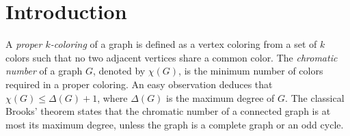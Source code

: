 \documentclass[11pt, a4paper]{article}
\theoremstyle{definition}
\newcommand{\<}{\subseteq}
\begin{document}
\section{Introduction}
A \textit{proper  $k$-coloring} of a graph is defined as a vertex coloring from a set of $k$
 colors such that no two adjacent vertices share a common color.  The \textit{chromatic number} of a graph  $G$, denoted by $\chi(G)$, is the minimum number of colors required in a proper coloring.  An easy observation deduces that $\chi(G)\leq \Delta(G)+1$, where $\Delta(G)$ is the maximum degree of $G$. The classical Brooks' theorem states that the chromatic number of a connected graph is at most its maximum degree, unless the graph is a complete graph or an odd cycle. 

\end{document}
